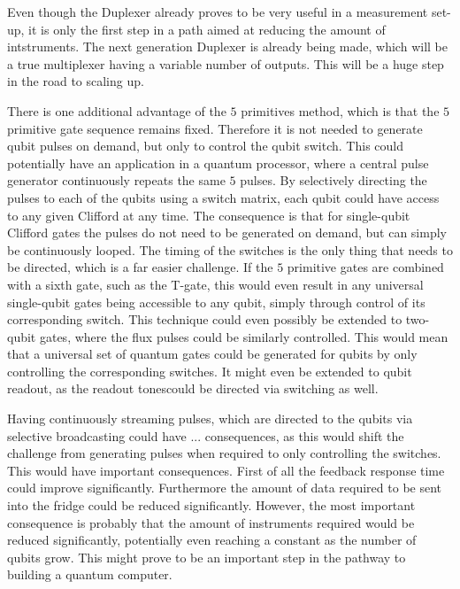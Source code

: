     Even though the Duplexer already proves to be very useful in a measurement set-up, it is only the first step in a path aimed at reducing the amount of intstruments. The next generation Duplexer is already being made, which will be a true multiplexer having a variable number of outputs. This will be a huge step in the road to scaling up.

    There is one additional advantage of the $5$ primitives method, which is that the $5$ primitive gate sequence remains fixed. Therefore it is not needed to generate qubit pulses on demand, but only to control the qubit switch. This could potentially have an application in a quantum processor, where a central pulse generator continuously repeats the same $5$ pulses. By selectively directing the pulses to each of the qubits using a switch matrix, each qubit could have access to any given Clifford at any time. The consequence is that for single-qubit Clifford gates the pulses do not need to be generated on demand, but can simply be continuously looped. The timing of the switches is the only thing that needs to be directed, which is a far easier challenge. If the $5$ primitive gates are combined with a sixth gate, such as the T-gate, this would even result in any universal single-qubit gates being accessible to any qubit, simply through control of its corresponding switch.  This technique could even possibly be extended to two-qubit gates, where the flux pulses could be similarly controlled. This would mean that a universal set of quantum gates could be generated for qubits by only controlling the corresponding switches. It might even be extended to qubit readout, as the readout tonescould be directed via switching as well.

    Having continuously streaming pulses, which are directed to the qubits via selective broadcasting could have ... consequences, as this would shift the challenge from generating pulses when required to only controlling the switches. This would have important consequences. First of all the feedback response time could improve significantly. Furthermore the amount of data required to be sent into the fridge could be reduced significantly. However, the most important consequence is probably that the amount of instruments required would be reduced significantly, potentially even reaching a constant as the number of qubits grow. This might prove to be an important step in the pathway to building a quantum computer.